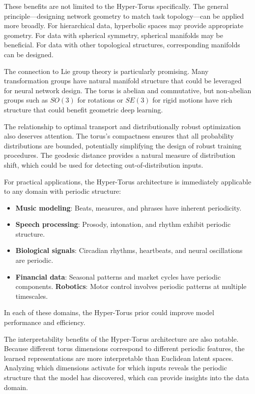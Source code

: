 \documentclass[12pt,letterpaper,twoside]{article}
\begin{document}
These benefits are not limited to the Hyper-Torus specifically. The general principle—designing network geometry to match task topology—can be applied more broadly. For hierarchical data, hyperbolic spaces may provide appropriate geometry. For data with spherical symmetry, spherical manifolds may be beneficial. For data with other topological structures, corresponding manifolds can be designed.

The connection to Lie group theory is particularly promising. Many transformation groups have natural manifold structure that could be leveraged for neural network design. The torus is abelian and commutative, but non-abelian groups such as $SO(3)$ for rotations or $SE(3)$ for rigid motions have rich structure that could benefit geometric deep learning.

The relationship to optimal transport and distributionally robust optimization also deserves attention. The torus's compactness ensures that all probability distributions are bounded, potentially simplifying the design of robust training procedures. The geodesic distance provides a natural measure of distribution shift, which could be used for detecting out-of-distribution inputs.

For practical applications, the Hyper-Torus architecture is immediately applicable to any domain with periodic structure:
\begin{itemize}
    \item \textbf{Music modeling}: Beats, measures, and phrases have inherent periodicity.
    \item \textbf{Speech processing}: Prosody, intonation, and rhythm exhibit periodic structure.
    \item \textbf{Biological signals}: Circadian rhythms, heartbeats, and neural oscillations are periodic.
    \item \textbf{Financial data}: Seasonal patterns and market cycles have periodic components.
    \textbf{Robotics}: Motor control involves periodic patterns at multiple timescales.
\end{itemize}
In each of these domains, the Hyper-Torus prior could improve model performance and efficiency.

The interpretability benefits of the Hyper-Torus architecture are also notable. Because different torus dimensions correspond to different periodic features, the learned representations are more interpretable than Euclidean latent spaces. Analyzing which dimensions activate for which inputs reveals the periodic structure that the model has discovered, which can provide insights into the data domain.
\end{document}
